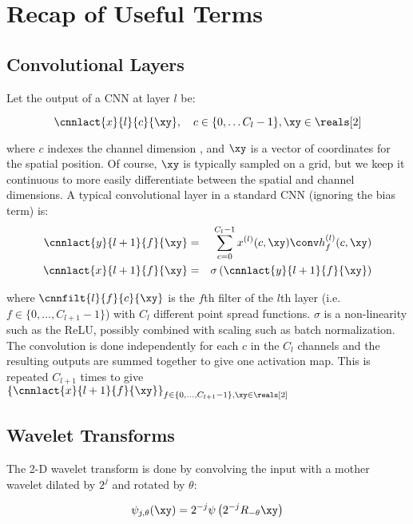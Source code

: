 \section{Recap of Useful Terms}\label{sec:ch5:background}

\subsection{Convolutional Layers}\label{sec:ch5:conv}

Let the output of a CNN at layer $l$ be:

$$ \cnnlact{x}{l}{c}{\xy}, \quad c\in \{0, \ldots C_l-1\}, \xy \in \reals[2]$$

where $c$ indexes the channel dimension , and $\xy$ is a vector of coordinates
for the spatial position. Of course, $\xy$ is typically sampled on a grid, but
we keep it continuous to more easily differentiate between the spatial and
channel dimensions. A typical convolutional layer in a standard CNN (ignoring
the bias term) is:
%
\begin{eqnarray} 
  \cnnlact{y}{l+1}{f}{\xy} &=& \sum_{c=0}^{C_l - 1}  x^{(l)}(c,\xy) \conv h^{(l)}_{f}(c, \xy)
    \label{eq:ch5:conv}\\
    \cnnlact{x}{l+1}{f}{\xy} & = & \sigma \left( \cnnlact{y}{l+1}{f}{\xy} \right) \label{eq:ch5:nonlin}
\end{eqnarray}

where $\cnnfilt{l}{f}{c}{\xy}$ is the $f$th filter of the $l$th layer (i.e. $f \in \{0,
\ldots, C_{l+1}-1 \}$) with $C_l$ different point spread functions. $\sigma$ is a non-linearity 
such as the ReLU, possibly combined with scaling such as batch normalization. The convolution
is done independently for each $c$ in the $C_l$ channels and the resulting outputs are
summed together to give one activation map. This is repeated $C_{l+1}$ times to
give $\left\{ \cnnlact{x}{l+1}{f}{\xy} \right\}_{f \in \{0, \ldots, C_{l+1}-1 \}, \xy \in \reals[2]}$

\subsection{Wavelet Transforms}\label{sec:ch5:wavelets}
The 2-D wavelet transform is done by convolving the input with a mother wavelet
dilated by $2^j$ and rotated by $\theta$:

\begin{equation}
  \psi_{j, \theta}(\xy) = 2^{-j}\psi \left(2^{-j} R_{-\theta} \xy\right)
\end{equation}

